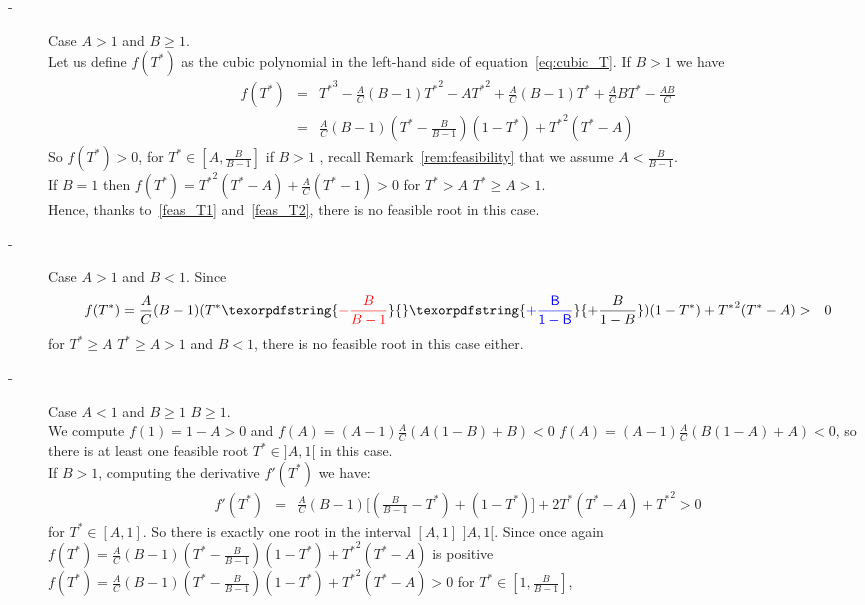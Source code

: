 \documentclass[a4paper, 12pt]{article}
\providecommand{\DIFaddtex}[1]{{\protect\color{blue} \sf #1}} %
\providecommand{\DIFdeltex}[1]{{\protect\color{red} \scriptsize #1}} %
\providecommand{\DIFaddbegin}{} %
\providecommand{\DIFaddend}{} %
\providecommand{\DIFdelbegin}{} %
\providecommand{\DIFdelend}{} %
\providecommand{\DIFadd}[1]{\texorpdfstring{\DIFaddtex{#1}}{#1}} %
\providecommand{\DIFdel}[1]{\texorpdfstring{\DIFdeltex{#1}}{}} %
\begin{document}
\begin{description}
\item[-] Case $A > 1$ and $B \geq 1$.\\ 
Let us define $f(T^*)$ as the cubic polynomial in the left-hand side of equation~\eqref{eq:cubic_T}. 
If $B>1$ we have
\begin{eqnarray*}
f(T^*)&=&{T^*}^3-\frac{A}{C}(B-1){T^*}^2-A{T^*}^2+\frac{A}{C}(B-1)T^*+\frac{A}{C}BT^*-\frac{AB}{C}\\\nonumber
&=&\frac{A}{C}(B-1)(T^*-\frac{B}{B-1})(1-T^*)+{T^*}^2(T^*-A)
\end{eqnarray*} 
So $f(T^*)>0$, for $T^* \in [A, \frac{B}{B-1}]$  if $B>1$\DIFaddbegin \DIFadd{, recall Remark~\ref{rem:feasibility} that we assume $A < \frac{B}{B-1}$}\DIFaddend .\\
If $B=1$ then $f(T^*)={T^*}^2(T^*-A)+\frac{A}{C}(T^*-1)>0$ for \DIFdelbegin \DIFdel{$T^*>A$}\DIFdelend \DIFaddbegin \DIFadd{$T^*\geq A > 1$}\DIFaddend .\\
Hence, thanks to~\eqref{feas_T1} and~\eqref{feas_T2}, there is no feasible root in this case.
\item[-] Case $A > 1$ and $B < 1$.
Since \begin{eqnarray*}
f(T^*)=\frac{A}{C}(B-1)(T^*\DIFdelbegin \DIFdel{-\frac{B}{B-1}}\DIFdelend \DIFaddbegin \DIFadd{+\frac{B}{1-B}}\DIFaddend )(1-T^*)+{T^*}^2(T^*-A)&>&0
\end{eqnarray*}
for \DIFdelbegin \DIFdel{$T^* \geq A$ }\DIFdelend \DIFaddbegin \DIFadd{$T^* \geq A > 1$ }\DIFaddend and $B<1$, there is no feasible root in this case either. 
\item[-] Case $A < 1$ and \DIFdelbegin \DIFdel{$B  \geq1$}\DIFdelend \DIFaddbegin \DIFadd{$B  \geq 1$}\DIFaddend .\\
We compute $f(1)=1-A>0$ and \DIFdelbegin \DIFdel{$f(A)=(A-1)\frac{A}{C}(A(1-B)+B)<0$}\DIFdelend \DIFaddbegin \DIFadd{$f(A)=(A-1)\frac{A}{C}(B(1-A)+A)<0$}\DIFaddend , 
so there is at least one feasible root  \DIFaddbegin \DIFadd{$T^* \in ]A,1[$ }\DIFaddend in this case.\\
If $B>1$, computing the derivative $f'(T^*)$ we have:
\begin{eqnarray*}
f'(T^*) &=& \frac{A}{C}(B-1)\big[(\frac{B}{B-1}-T^*)+(1-T^*)\big]+2{T^*}(T^*-A)+{T^*}^2 >0
\end{eqnarray*}
for $T^* \in [A,1]$. So there is exactly one root in the interval \DIFdelbegin \DIFdel{$[A,1]$}\DIFdelend \DIFaddbegin \DIFadd{$]A,1[$}\DIFaddend .
Since once again \DIFdelbegin \DIFdel{$f(T^*)=\frac{A}{C}(B-1)(T^*-\frac{B}{B-1})(1-T^*)+{T^*}^2(T^*-A)$ is positive }\DIFdelend \DIFaddbegin \DIFadd{$f(T^*)=\frac{A}{C}(B-1)(T^*-\frac{B}{B-1})(1-T^*)+{T^*}^2(T^*-A) >0$  }\DIFaddend for $T^* \in [1, \frac{B}{B-1}]$, 

\end{description}
\end{document}
